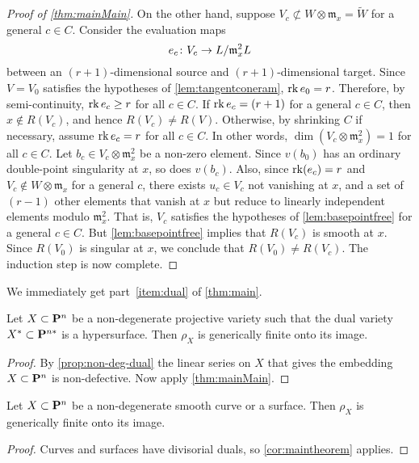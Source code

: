 \begin{proof}[Proof of \autoref{thm:mainMain}]
  On the other hand, suppose $V_c \not \subset W \otimes \mathfrak m_x = \widetilde W$ for a general $c \in C$.
  Consider the evaluation maps
  \[ e_c \from V_c \to L / \mathfrak m_x^2 L \]
  between an $(r+1)$-dimensional source and $(r+1)$-dimensional target.
  Since $V = V_0$ satisfies the hypotheses of \autoref{lem:tangentconeram}, $\rk e_0 = r$.
  Therefore, by semi-continuity, $\rk e_c \geq r$ for all $c \in C$.
  If $\rk e_c = (r+1)$ for a general $c \in C$, then $x \not \in R(V_c)$, and hence $R(V_c) \neq R(V)$.
  Otherwise, by shrinking $C$ if necessary, assume $\rk e_c = r$ for all $c \in C$.
  In other words, $\dim (V_c \otimes \mathfrak m_x^2) = 1$ for all $c \in C$.
  Let $b_c \in V_c \otimes \mathfrak m_x^2$ be a non-zero element.
  Since $v(b_0)$ has an ordinary double-point singularity at $x$, so does $v(b_c)$.
  Also, since $\rk (e_c) = r$ and $V_c \not \in W \otimes \mathfrak m_x$ for a general $c$, there exists $u_c \in V_c$ not vanishing at $x$, and a set of $(r-1)$ other elements that vanish at $x$ but reduce to linearly independent elements modulo $\mathfrak m_x^2$.
  That is, $V_c$ satisfies the hypotheses of \autoref{lem:basepointfree} for a general $c \in C$.
  But \autoref{lem:basepointfree} implies that $R(V_c)$ is smooth at $x$.
  Since $R(V_0)$ is singular at $x$, we conclude that $R(V_0) \neq R(V_c)$.
  The induction step is now complete.
\end{proof}

We immediately get part~\eqref{item:dual} of \autoref{thm:main}.
\begin{corollary}
  \label{cor:maintheorem} Let $X \subset \P^{n}$ be a non-degenerate projective variety such that the dual variety $X^{*} \subset \P^{n*}$ is a hypersurface. Then $\rho_{X}$ is generically finite onto its image.
\end{corollary}
\begin{proof}
  By \autoref{prop:non-deg-dual} the linear series on $X$ that gives the embedding $X \subset \P^n$ is non-defective.
  Now apply \autoref{thm:mainMain}.
\end{proof}

\begin{corollary}\label{cor:lowdim}
  Let $X \subset \P^n$ be a non-degenerate smooth curve or a surface.
  Then $\rho_X$ is generically finite onto its image.
\end{corollary}
\begin{proof}
  Curves and surfaces have divisorial duals, so \autoref{cor:maintheorem} applies.
\end{proof}


